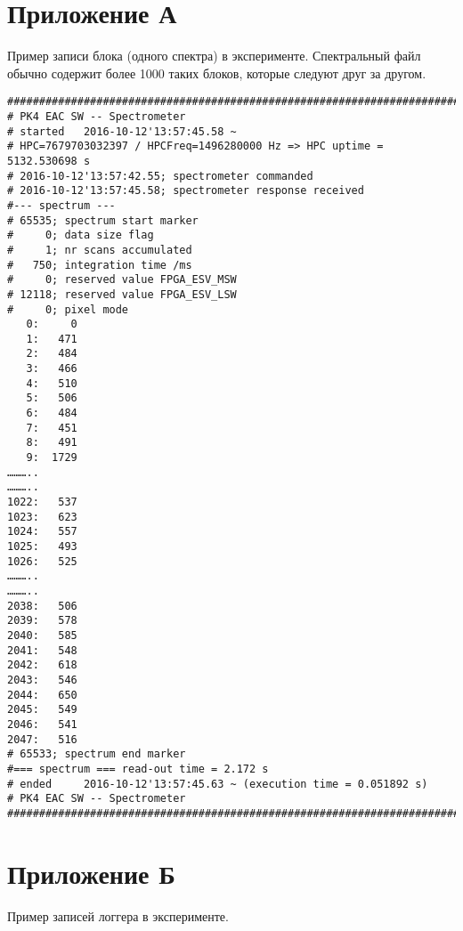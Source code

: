 \App
\label{app}

\section{Приложение А}
\label{app:app1}
Пример записи блока (одного спектра) в эксперименте. Спектральный файл обычно содержит более 1000 таких блоков, которые
следуют друг за другом.

\begin{small}
\begin{verbatim}
#########################################################################
# PK4 EAC SW -- Spectrometer
# started   2016-10-12'13:57:45.58 ~
# HPC=7679703032397 / HPCFreq=1496280000 Hz => HPC uptime = 5132.530698 s
# 2016-10-12'13:57:42.55; spectrometer commanded
# 2016-10-12'13:57:45.58; spectrometer response received
#--- spectrum ---
# 65535; spectrum start marker
#     0; data size flag
#     1; nr scans accumulated
#   750; integration time /ms
#     0; reserved value FPGA_ESV_MSW
# 12118; reserved value FPGA_ESV_LSW
#     0; pixel mode
   0:     0
   1:   471
   2:   484
   3:   466
   4:   510
   5:   506
   6:   484
   7:   451
   8:   491
   9:  1729
………..
………..
1022:   537
1023:   623
1024:   557
1025:   493
1026:   525
………..
………..
2038:   506
2039:   578
2040:   585
2041:   548
2042:   618
2043:   546
2044:   650
2045:   549
2046:   541
2047:   516
# 65533; spectrum end marker
#=== spectrum === read-out time = 2.172 s
# ended     2016-10-12'13:57:45.63 ~ (execution time = 0.051892 s)
# PK4 EAC SW -- Spectrometer
#########################################################################
\end{verbatim}
\end{small}

\section{Приложение Б}
\label{app:app2}
Пример записей логгера в эксперименте.

